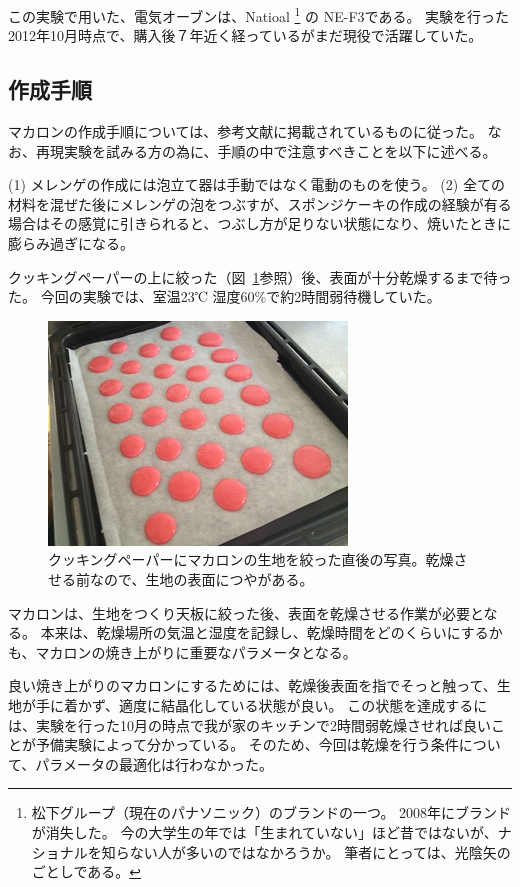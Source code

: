 \documentclass[uplatex,dvipdfmx,a4j,12pt]{jsarticle}
\begin{document}
この実験で用いた、電気オーブンは、Natioal
\footnote{
    松下グループ（現在のパナソニック）のブランドの一つ。
    2008年にブランドが消失した。
    今の大学生の年では「生まれていない」ほど昔ではないが、ナショナルを知らない人が多いのではなかろうか。
    筆者にとっては、光陰矢のごとしである。
}
の NE-F3である。 
実験を行った2012年10月時点で、購入後７年近く経っているがまだ現役で活躍していた。

\subsection{作成手順}

マカロンの作成手順については、参考文献\cite{cuoca}に掲載されているものに従った。
なお、再現実験を試みる方の為に、手順の中で注意すべきことを以下に述べる。

(1) メレンゲの作成には泡立て器は手動ではなく電動のものを使う。
(2) 全ての材料を混ぜた後にメレンゲの泡をつぶすが、スポンジケーキの作成の経験が有る場合はその感覚に引きられると、つぶし方が足りない状態になり、焼いたときに膨らみ過ぎになる。

クッキングペーパーの上に絞った（図~\ref{fig:fig01}参照）後、表面が十分乾燥するまで待った。 
今回の実験では、室温23℃ 湿度60\%で約2時間弱待機していた。

\begin{figure}[b]
    \centering
    \includegraphics[width=0.5\linewidth]{fig01.jpg}
    \caption{クッキングペーパーにマカロンの生地を絞った直後の写真。乾燥させる前なので、生地の表面につやがある。}
    \label{fig:fig01}
\end{figure}

マカロンは、生地をつくり天板に絞った後、表面を乾燥させる作業が必要となる。
本来は、乾燥場所の気温と湿度を記録し、乾燥時間をどのくらいにするかも、マカロンの焼き上がりに重要なパラメータとなる。

良い焼き上がりのマカロンにするためには、乾燥後表面を指でそっと触って、生地が手に着かず、適度に結晶化している状態が良い。
この状態を達成するには、実験を行った10月の時点で我が家のキッチンで2時間弱乾燥させれば良いことが予備実験によって分かっている。
そのため、今回は乾燥を行う条件について、パラメータの最適化は行わなかった。
\end{document}
